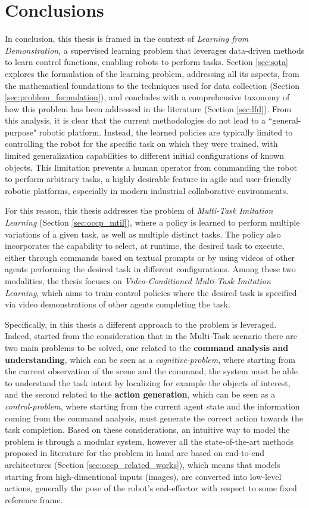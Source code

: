 \chapter{Conclusions}
\label{sec:conclusion}
In conclusion, this thesis is framed in the context of \textit{Learning from Demonstration}, a supervised learning problem that leverages data-driven methods to learn control functions, enabling robots to perform tasks. Section \ref{sec:sota} explores the formulation of the learning problem, addressing all its aspects, from the mathematical foundations to the techniques used for data collection (Section \ref{sec:problem_formulation}), and concludes with a comprehensive taxonomy of how this problem has been addressed in the literature (Section \ref{sec:lfd}). From this analysis, it is clear that the current methodologies do not lead to a ``general-purpose" robotic platform. Instead, the learned policies are typically limited to controlling the robot for the specific task on which they were trained, with limited generalization capabilities to different initial configurations of known objects. This limitation prevents a human operator from commanding the robot to perform arbitrary tasks, a highly desirable feature in agile and user-friendly robotic platforms, especially in modern industrial collaborative environments.

For this reason, this thesis addresses the problem of \textit{Multi-Task Imitation Learning} (Section \ref{sec:occp_mtil}), where a policy is learned to perform multiple variations of a given task, as well as multiple distinct tasks. The policy also incorporates the capability to select, at runtime, the desired task to execute, either through commands based on textual prompts or by using videos of other agents performing the desired task in different configurations. Among these two modalities, the thesis focuses on \textit{Video-Conditioned Multi-Task Imitation Learning}, which aims to train control policies where the desired task is specified via video demonstrations of other agents completing the task.

Specifically, in this thesis a different approach to the problem is leveraged. Indeed, started from the consideration that in the Multi-Task scenario there are two main problems to be solved, one related to the \textbf{command analysis and understanding}, which can be seen as a \textit{cognitive-problem}, where starting from the current observation of the scene and the command, the system must be able to understand the task intent by localizing for example the objects of interest, and the second related to the \textbf{action generation}, which can be seen as a \textit{control-problem}, where starting from the current agent state and the information coming from the command analysis, must generate the correct action towards the task completion. Based on these considerations, an intuitive way to model the problem is through a modular system, however all the state-of-the-art methods proposed in literature for the problem in hand are based on end-to-end architectures (Section \ref{sec:occp_related_works}), which means that models starting from high-dimentional inputs (images), are converted into low-level actions, generally the pose of the robot's end-effector with respect to some fixed reference frame. 

